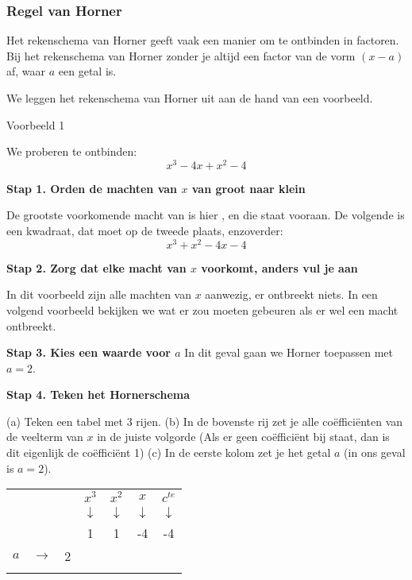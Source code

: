 \subsubsection{Regel van Horner}

\begin{eigenschap}
	Het rekenschema van Horner geeft vaak een manier om te ontbinden in factoren. Bij het rekenschema van Horner zonder je altijd een factor van de vorm $(x-a)$ af, waar $a$ een getal is.
\end{eigenschap}

We leggen het rekenschema van Horner uit aan de hand van een voorbeeld.

Voorbeeld 1
\begin{voorbeeld}
We proberen te ontbinden:
\begin{equation*}
x^3-4x+x^2-4
\end{equation*}

\textbf{Stap 1. Orden de machten van $x$ van groot naar klein}

De grootste voorkomende macht van  is hier , en die staat vooraan. De volgende is een kwadraat, dat moet op de tweede plaats, enzoverder: 
\begin{equation*}
x^3+x^2-4x-4
\end{equation*}

\textbf{Stap 2. Zorg dat elke macht van $x$ voorkomt, anders vul je aan}

In dit voorbeeld zijn alle machten van $x$ aanwezig, er ontbreekt niets. In een volgend voorbeeld bekijken we wat er zou moeten gebeuren als er wel een macht ontbreekt.

\textbf{Stap 3. Kies een waarde voor $a$}
In dit geval gaan we Horner toepassen met $a=2$.

\textbf{Stap 4. Teken het Hornerschema}

(a) Teken een tabel met 3 rijen. 
(b) In de bovenste rij zet je alle co\"effici\"enten van de veelterm van $x$ in de juiste volgorde (Als er geen co\"effici\"ent bij  staat, dan is dit eigenlijk de co\"effici\"ent 1) 
(c) In de eerste kolom zet je het getal $a$ (in ons geval is $a=2$).

\begin{center}
	\begin{tabular}{ccc|cccc}
	& & & $x^3$ & $x^2$ & $x$ & $c^{te}$ \\
	& & & $\downarrow$ & $\downarrow$ & $\downarrow$ & $\downarrow$\\
	& & & 1 & 1 & -4 & -4 \\
	$a$ & $\rightarrow$ & 2 & & & & \\
	\hline 
	& & & & & & 
	\end{tabular}
\end{center}



\end{voorbeeld}
